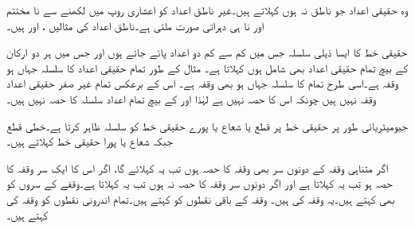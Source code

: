 وہ حقیقی اعداد جو ناطق نہ ہوں  کہلاتے ہیں۔غیر ناطق اعداد کو اعشاری روپ میں لکھنے سے نا مختتم اور نا ہی دہراتی صورت ملتی ہے۔ناطق اعداد  کی مثالیں ،  اور  ہیں۔

حقیقی خط کا ایسا ذیلی سلسلہ جس میں کم سے کم دو اعداد پائے جاتے ہوں اور جس میں ہر دو ارکان کے بیچ تمام  حقیقی اعداد بھی  شامل ہوں  کہلاتا ہے۔ مثال کے طور تمام حقیقی اعداد  کا سلسلہ جہاں  ہو وقفہ ہے۔اسی طرح تمام  کا سلسلہ جہاں  ہو بھی وقفہ ہے۔ اس کے برعکس تمام غیر صفر حقیقی اعداد وقفہ نہیں ہیں چونکہ  اس کا حصہ نہیں ہے لہٰذا  اور  کے بیچ تمام اعداد سلسلہ کا حصہ نہیں ہیں۔

جیومیٹریائی طور پر حقیقی خط پر قطع یا شعاع یا پورے حقیقی خط کو سلسلہ ظاہر کرتا ہے۔خطی قطع  جبکہ شعاع یا پورا حقیقی خط  کہلاتے ہیں۔

اگر متناہی وقفہ کے دونوں سر بھی وقفہ کا حصہ ہوں تب یہ  کہلائے گا، اگر اس کا ایک سر وقفہ کا حصہ ہو تب یہ  کہلاتا ہے اور اگر دونوں سر وقفہ کا حصہ  نہ ہوں تب یہ  کہلاتا ہے۔وقفے کے سروں کو  بھی کہتے ہیں۔یہ وقفہ کی   ہیں۔ وقفہ کے باقی نقطوں کو  کہتے ہیں۔تمام اندرونی نقطوں کو وقفہ کی  کہتے ہیں۔

